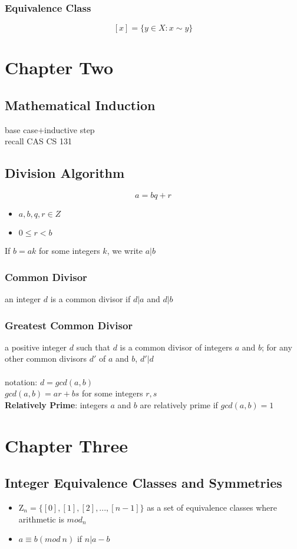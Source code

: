 \documentclass{article}
\begin{document}
\subsubsection{Equivalence Class}
$$[x]=\{y\in X: x\sim y\}$$
\section{Chapter Two}
\subsection{Mathematical Induction}
base case+inductive step\\
recall CAS CS 131
\subsection{Division Algorithm}
$$a=bq+r$$
\begin{itemize}
    \item $a,b,q,r \in Z$
    \item $0\leq r<b$
\end{itemize}
If $b=ak$ for some integers $k$, we write $a|b$
\subsubsection{Common Divisor}
an integer $d$ is a common divisor if $d|a$ and $d|b$
\subsubsection{Greatest Common Divisor}
a positive integer $d$ such that $d$ is a common divisor of integers $a$ and $b$; for any other common divisors $d'$ of $a$ and $b$, $d'|d$\\\\
notation: $d=gcd(a,b)$\\
$gcd(a,b)=ar+bs$ for some integers $r,s$\\

\textbf{Relatively Prime}: integers $a$ and $b$ are relatively prime if $gcd(a,b)=1$\\

\section{Chapter Three}
\subsection{Integer Equivalence Classes and Symmetries}
\begin{itemize}
    \item $\mathrm{Z}_n=\{[0],[1],[2],...,[n-1]\}$ as a set of equivalence classes where arithmetic is $mod_n$
    \item $a\equiv b(mod \: n)$ if $n|a-b$
\end{itemize}
\end{document}
